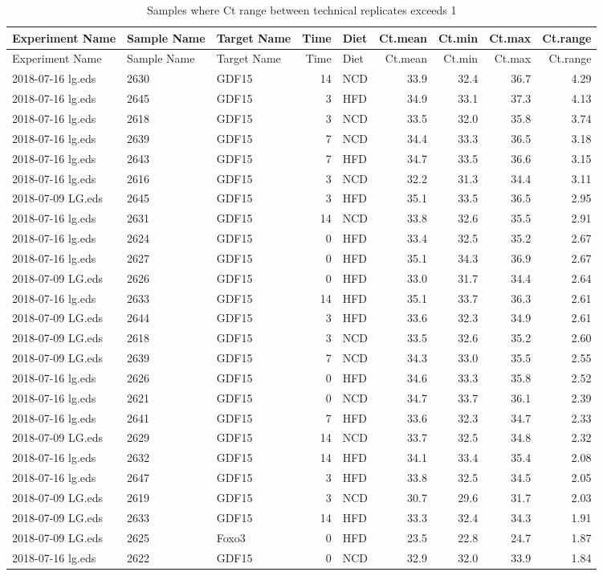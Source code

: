 \documentclass[]{article}
\begin{document}
\begin{longtable}[]{@{}lllrlrrrr@{}}
\caption{Samples where Ct range between technical replicates exceeds
1}\tabularnewline
\toprule
Experiment Name & Sample Name & Target Name & Time & Diet & Ct.mean &
Ct.min & Ct.max & Ct.range\tabularnewline
\midrule
\endfirsthead
\toprule
Experiment Name & Sample Name & Target Name & Time & Diet & Ct.mean &
Ct.min & Ct.max & Ct.range\tabularnewline
\midrule
\endhead
2018-07-16 lg.eds & 2630 & GDF15 & 14 & NCD & 33.9 & 32.4 & 36.7 &
4.29\tabularnewline
2018-07-16 lg.eds & 2645 & GDF15 & 3 & HFD & 34.9 & 33.1 & 37.3 &
4.13\tabularnewline
2018-07-16 lg.eds & 2618 & GDF15 & 3 & NCD & 33.5 & 32.0 & 35.8 &
3.74\tabularnewline
2018-07-16 lg.eds & 2639 & GDF15 & 7 & NCD & 34.4 & 33.3 & 36.5 &
3.18\tabularnewline
2018-07-16 lg.eds & 2643 & GDF15 & 7 & HFD & 34.7 & 33.5 & 36.6 &
3.15\tabularnewline
2018-07-16 lg.eds & 2616 & GDF15 & 3 & NCD & 32.2 & 31.3 & 34.4 &
3.11\tabularnewline
2018-07-09 LG.eds & 2645 & GDF15 & 3 & HFD & 35.1 & 33.5 & 36.5 &
2.95\tabularnewline
2018-07-16 lg.eds & 2631 & GDF15 & 14 & NCD & 33.8 & 32.6 & 35.5 &
2.91\tabularnewline
2018-07-16 lg.eds & 2624 & GDF15 & 0 & HFD & 33.4 & 32.5 & 35.2 &
2.67\tabularnewline
2018-07-16 lg.eds & 2627 & GDF15 & 0 & HFD & 35.1 & 34.3 & 36.9 &
2.67\tabularnewline
2018-07-09 LG.eds & 2626 & GDF15 & 0 & HFD & 33.0 & 31.7 & 34.4 &
2.64\tabularnewline
2018-07-16 lg.eds & 2633 & GDF15 & 14 & HFD & 35.1 & 33.7 & 36.3 &
2.61\tabularnewline
2018-07-09 LG.eds & 2644 & GDF15 & 3 & HFD & 33.6 & 32.3 & 34.9 &
2.61\tabularnewline
2018-07-09 LG.eds & 2618 & GDF15 & 3 & NCD & 33.5 & 32.6 & 35.2 &
2.60\tabularnewline
2018-07-09 LG.eds & 2639 & GDF15 & 7 & NCD & 34.3 & 33.0 & 35.5 &
2.55\tabularnewline
2018-07-16 lg.eds & 2626 & GDF15 & 0 & HFD & 34.6 & 33.3 & 35.8 &
2.52\tabularnewline
2018-07-16 lg.eds & 2621 & GDF15 & 0 & NCD & 34.7 & 33.7 & 36.1 &
2.39\tabularnewline
2018-07-16 lg.eds & 2641 & GDF15 & 7 & HFD & 33.6 & 32.3 & 34.7 &
2.33\tabularnewline
2018-07-09 LG.eds & 2629 & GDF15 & 14 & NCD & 33.7 & 32.5 & 34.8 &
2.32\tabularnewline
2018-07-16 lg.eds & 2632 & GDF15 & 14 & HFD & 34.1 & 33.4 & 35.4 &
2.08\tabularnewline
2018-07-16 lg.eds & 2647 & GDF15 & 3 & HFD & 33.8 & 32.5 & 34.5 &
2.05\tabularnewline
2018-07-09 LG.eds & 2619 & GDF15 & 3 & NCD & 30.7 & 29.6 & 31.7 &
2.03\tabularnewline
2018-07-09 LG.eds & 2633 & GDF15 & 14 & HFD & 33.3 & 32.4 & 34.3 &
1.91\tabularnewline
2018-07-09 LG.eds & 2625 & Foxo3 & 0 & HFD & 23.5 & 22.8 & 24.7 &
1.87\tabularnewline
2018-07-16 lg.eds & 2622 & GDF15 & 0 & NCD & 32.9 & 32.0 & 33.9 &
1.84\tabularnewline

\end{longtable}
\end{document}
